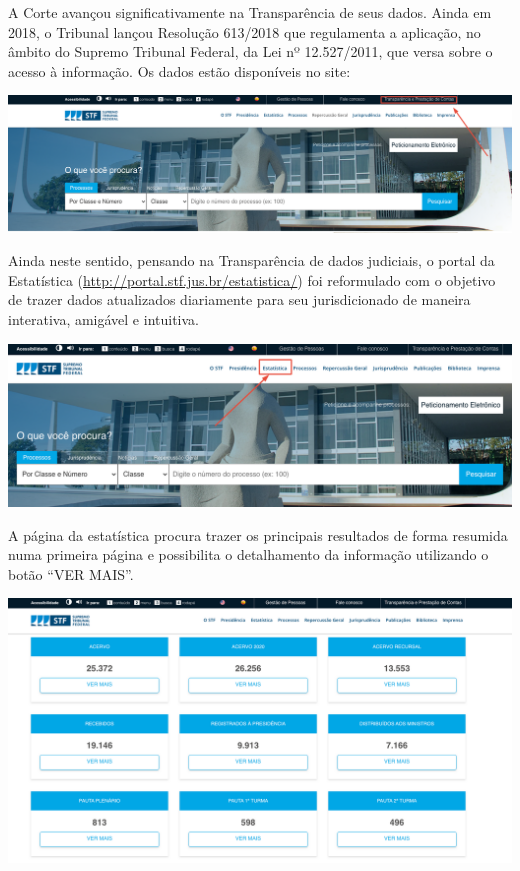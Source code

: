\documentclass[
]{book}
\begin{document}
A Corte avançou significativamente na Transparência de seus dados. Ainda em 2018, o Tribunal lançou Resolução 613/2018 que regulamenta a aplicação, no âmbito do Supremo Tribunal Federal, da Lei nº 12.527/2011, que versa sobre o acesso à informação. Os dados estão disponíveis no site:

\begin{center}\includegraphics[width=1.1\linewidth,height=1.3\textheight]{imagens/imagem_1_introducao} \end{center}

Ainda neste sentido, pensando na Transparência de dados judiciais, o portal da Estatística (\url{http://portal.stf.jus.br/estatistica/}) foi reformulado com o objetivo de trazer dados atualizados diariamente para seu jurisdicionado de maneira interativa, amigável e intuitiva.

\begin{center}\includegraphics[width=1.1\linewidth,height=1.3\textheight]{imagens/imagem_2_introducao} \end{center}

A página da estatística procura trazer os principais resultados de forma resumida numa primeira página e possibilita o detalhamento da informação utilizando o botão ``VER MAIS''.

\begin{center}\includegraphics[width=1.1\linewidth,height=1.3\textheight]{imagens/imagem_3_introducao} \end{center}
\end{document}
